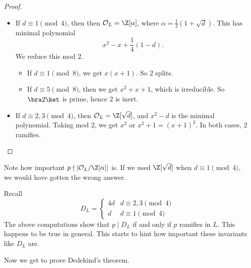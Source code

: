 \documentclass[a4paper]{article}
\begin{document}
\begin{proof}\leavevmode
  \begin{itemize}
    \item If $d \equiv 1 \pmod 4$, then then $\mathcal{O}_L = \Z[\alpha]$, where $\alpha = \frac{1}{2}(1 + \sqrt{d})$. This has minimal polynomial
      \[
        x^2 - x + \frac{1}{4}(1 - d).
      \]
      We reduce this mod $2$.
      \begin{itemize}
        \item If $d \equiv 1\pmod 8$, we get $x(x + 1)$. So $2$ splits.
        \item If $d \equiv 5 \pmod 8$, then we get $x^2 + x + 1$, which is irreducible. So $\bra 2\ket$ is prime, hence $2$ is inert.
      \end{itemize}
    \item If $d \equiv 2, 3\pmod 4$, then $\mathcal{O}_L = \Z[\sqrt{d}]$, and $x^2 - d$ is the minimal polynomial. Taking mod $2$, we get $x^2$ or $x^2 + 1 = (x + 1)^2$. In both cases, $2$ ramifies.
  \end{itemize}
\end{proof}

Note how important $p \nmid |\mathcal{O}_L/\Z[\alpha]|$ is. If we used $\Z[\sqrt{d}]$ when $d \equiv 1 \pmod 4$, we would have gotten the wrong answer.

Recall
\[
  D_L =
  \begin{cases}
    4d & d \equiv 2, 3\pmod 4\\
    d & d \equiv 1 \pmod 4
  \end{cases}
\]
The above computations show that $p \mid D_L$ if and only if $p$ ramifies in $L$. This happens to be true in general. This starts to hint how important these invariants like $D_L$ are.

Now we get to prove Dedekind's theorem.

%
\end{document}
